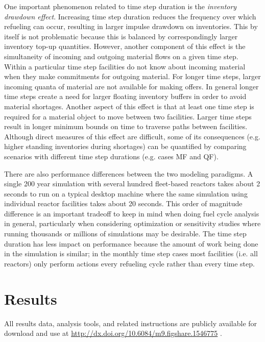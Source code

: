 \documentclass{style}
\begin{document}
One important phenomenon related to time step duration is the \emph{inventory
drawdown effect}.  Increasing time step duration reduces the frequency over
which refueling can occur, resulting in larger impulse drawdown on
inventories. This by itself is not problematic because this is balanced by
correspondingly larger inventory top-up quantities.  However, another component of
this effect is the simultaneity of incoming and outgoing material flows on a
given time step.  Within a particular time step facilities do not know about
incoming material when they make commitments for outgoing material.  For
longer time steps, larger incoming quanta of material are not available for
making offers. In general longer time steps create a need for larger floating
inventory buffers in order to avoid material shortages.  Another aspect of
this effect is that at least one time step is required for a material object to move between two facilities. Larger time steps result in longer minimum
bounds on time to traverse paths between facilities. Although direct measures
of this effect are difficult, some of its consequences (e.g. higher standing
inventories during shortages) can be quantified by comparing scenarios with
different time step durations (e.g. cases MF and QF).

There are also performance differences between the two modeling paradigms.  A
single 200 year simulation with several hundred fleet-based reactors takes
about 2 seconds to run on a typical desktop machine where the same simulation
using individual reactor facilities takes about 20 seconds.  This order of
magnitude difference is an important tradeoff to keep in mind when doing fuel
cycle analysis in general, particularly when considering optimization or
sensitivity studies where running thousands or millions of simulations may be
desirable.  The time step duration has less impact on performance because the
amount of work being done in the simulation is similar; in the monthly time
step cases most facilities (i.e. all reactors) only perform actions every
refueling cycle rather than every time step.

\section{Results}

All results data, analysis tools, and related instructions are publicly
available for download and use at
\url{http://dx.doi.org/10.6084/m9.figshare.1546775} \cite{Carlsen2015}.
\end{document}
